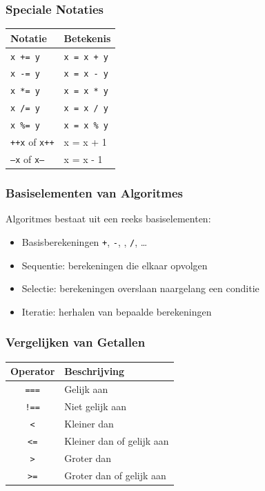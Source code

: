\documentclass{../khlslides}
\begin{document}
\begin{frame}
  \frametitle{Speciale Notaties}
  \begin{center}
    \begin{tabular}{l@{\hspace{1cm}}l}
      {\bf Notatie} & {\bf Betekenis} \\
      \toprule
      {\tt x += y} & {\tt x = x + y} \\
      {\tt x -= y} & {\tt x = x - y} \\
      {\tt x *= y} & {\tt x = x * y} \\
      {\tt x /= y} & {\tt x = x / y} \\
      {\tt x \%= y} & {\tt x = x \% y} \\[2mm]
      {\tt ++x} of {\tt x++} & {x = x + 1} \\
      {\tt --x} of {\tt x--} & {x = x - 1} \\
    \end{tabular}
  \end{center}
\end{frame}


\begin{frame}
  \frametitle{Basiselementen van Algoritmes}
  Algoritmes bestaat uit een reeks basiselementen:
  \vskip2mm
  \begin{itemize}
    \item Basisberekeningen {\tt +}, {\tt -}, {\tt *}, {\tt /}, \dots \vskip2mm
    \item Sequentie: berekeningen die elkaar opvolgen \vskip2mm
    \item Selectie: berekeningen overslaan naargelang een conditie \vskip2mm
    \item Iteratie: herhalen van bepaalde berekeningen
  \end{itemize}
\end{frame}


\begin{frame}
  \frametitle{Vergelijken van Getallen}
  \begin{center}
    \begin{tabular}{cl}
      {\bf Operator} & {\bf Beschrijving} \\
      \toprule
      {\tt ===} & Gelijk aan \\
      {\tt !==} & Niet gelijk aan \\
      {\tt <} & Kleiner dan \\
      {\tt <=} & Kleiner dan of gelijk aan \\
      {\tt >} & Groter dan \\
      {\tt >=} & Groter dan of gelijk aan \\
    \end{tabular}
  \end{center}
\end{frame}
\end{document}

